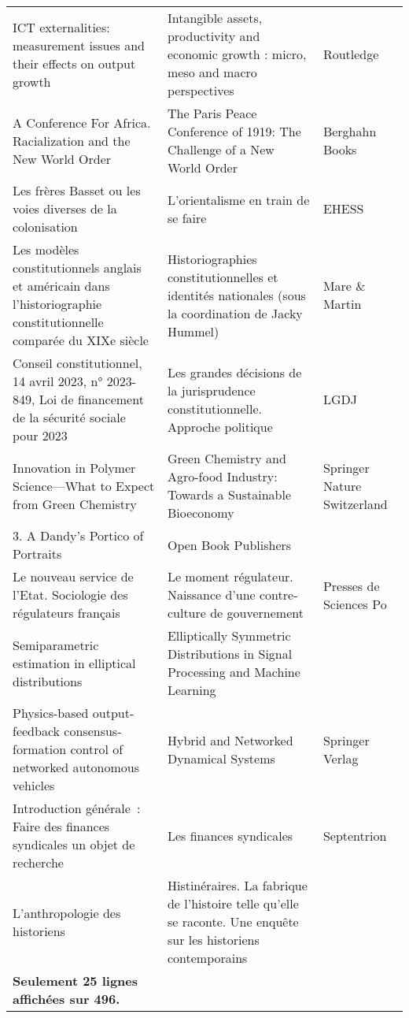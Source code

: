 \begin{longtable}{p{.4\linewidth}p{.35\linewidth}p{.15\linewidth}}
ICT externalities: measurement issues and their effects on output growth & Intangible assets, productivity and economic growth : micro, meso and macro perspectives & Routledge \\
A Conference For Africa. Racialization and the New World Order & The Paris Peace Conference of 1919: The Challenge of a New World Order & Berghahn Books \\
Les frères Basset ou les voies diverses de la colonisation & L’orientalisme en train de se faire & EHESS \\
Les modèles constitutionnels anglais et américain dans l’historiographie constitutionnelle comparée du XIXe siècle & Historiographies constitutionnelles et identités nationales (sous la coordination de Jacky Hummel) & Mare \& Martin \\
Conseil constitutionnel, 14 avril 2023, n° 2023-849, Loi de financement de la sécurité sociale pour 2023 & Les grandes décisions de la jurisprudence constitutionnelle. Approche politique & LGDJ \\
Innovation in Polymer Science—What to Expect from Green Chemistry & Green Chemistry and Agro-food Industry: Towards a Sustainable Bioeconomy & Springer Nature Switzerland \\
3. A Dandy's Portico of Portraits & Open Book Publishers &  \\
Le nouveau service de l'Etat. Sociologie des régulateurs français & Le moment régulateur. Naissance d'une contre-culture de gouvernement & Presses de Sciences Po \\
Semiparametric estimation in elliptical distributions & Elliptically Symmetric Distributions in Signal Processing and Machine Learning &  \\
Physics-based output-feedback consensus-formation control of networked autonomous vehicles & Hybrid and Networked Dynamical Systems & Springer Verlag \\
Introduction générale : Faire des finances syndicales un objet de recherche & Les finances syndicales & Septentrion \\
L'anthropologie des historiens & Histinéraires. La fabrique de l’histoire telle qu’elle se raconte. Une enquête sur les historiens contemporains &  \\
\textbf{Seulement 25 lignes affichées sur 496.} \\
\bottomrule
\end{longtable}
